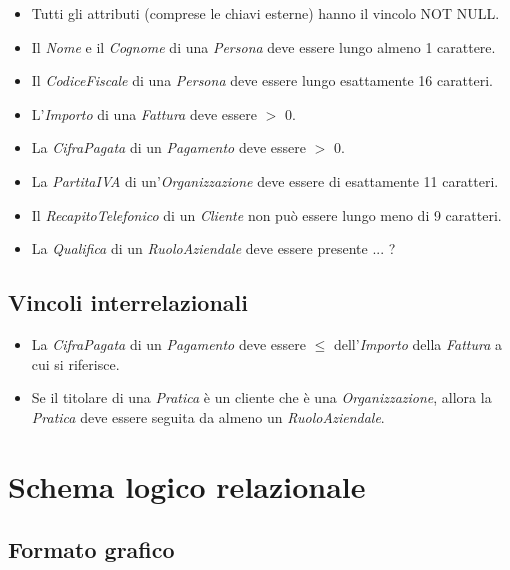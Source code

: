 \documentclass[a4paper,12pt]{article}
\begin{document}
\begin{itemize}
\item Tutti gli attributi (comprese le chiavi esterne) hanno il vincolo NOT NULL.

\item Il \textit{Nome} e il \textit{Cognome} di una \textit{Persona} deve essere lungo almeno 1 carattere.

\item Il \textit{CodiceFiscale} di una \textit{Persona} deve essere lungo esattamente 16 caratteri.

\item L'\textit{Importo} di una \textit{Fattura} deve essere $>$ 0.

\item La \textit{CifraPagata} di un \textit{Pagamento} deve essere $>$ 0.

\item La \textit{PartitaIVA} di un'\textit{Organizzazione} deve essere di esattamente 11 caratteri.

\item Il \textit{RecapitoTelefonico} di un \textit{Cliente} non può essere lungo meno di 9 caratteri.

\item La \textit{Qualifica} di un \textit{RuoloAziendale} deve essere presente ... ?
\end{itemize}

\subsection{ Vincoli interrelazionali }

\begin{itemize}
\item La \textit{CifraPagata} di un \textit{Pagamento} deve essere $\leq$ dell'\textit{Importo} della \textit{Fattura} a cui si riferisce.

\item Se il titolare di una \textit{Pratica} è un cliente che è una \textit{Organizzazione}, allora la \textit{Pratica} deve essere seguita da almeno un \textit{RuoloAziendale}.
\end{itemize}

 \section{ Schema logico relazionale }

 \subsection{ Formato grafico }
\end{document}
